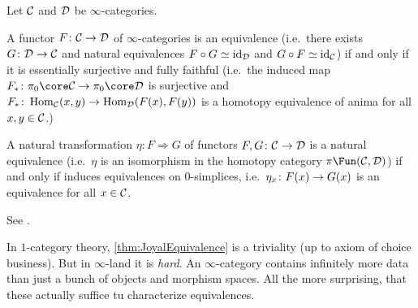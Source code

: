\documentclass[a4paper, 10pt, oneside, DIV=9, chapterprefix=true, numbers=enddot,bibliography=totoc]{scrbook}
\newcommand{\embrace}[1]{\textup{(}#1\textup{)}}
\begin{document}
\begin{thm}[Joyal]\label{thm:JoyalEquivalence}
	Let $\mathcal{C}$ and $\mathcal{D}$ be $\infty$-categories.
	\begin{alphanumerate}
		\item A functor $F\colon \Cc\morphism\Dd$ of $\infty$-categories is an equivalence \embrace{i.e.\ there exists $G\colon \Dd\morphism \Cc$ and natural equivalences $F\circ G\simeq \operatorname{id}_{\mathcal{D}}$ and $G\circ F\simeq \operatorname{id}_{\mathcal{C}}$} if and only if it is essentially surjective and fully faithful \embrace{i.e.\ the induced map $F_*\colon \pi_0\core\Cc\morphism\pi_0\core\Dd$ is surjective and $F_*\colon \Hom_\Cc(x,y)\morphism \Hom_\Dd(F(x),F(y))$ is a homotopy equivalence of anima for all $x,y\in \mathcal{C}$.}
		\item A natural transformation $\eta\colon F\Rightarrow G$ of functors $F,G\colon \Cc\morphism\Dd$ is a natural equivalence \embrace{i.e.\ $\eta$ is an isomorphism in the homotopy category $\pi\Fun(\Cc,\Dd)$} if and only if induces equivalences on $0$-simplices, i.e.\ $\eta_x\colon F(x)\morphism G(x)$ is an equivalence for all $x\in \mathcal{C}$.
	\end{alphanumerate}
\end{thm}
\begin{proof*}
	See \cite[Theorem~VII.1, Theorem~VII.8]{HigherCatsI}.
\end{proof*}
In $1$-category theory, \cref{thm:JoyalEquivalence} is a triviality (up to axiom of choice business). But in $\infty$-land it is \emph{hard}. An $\infty$-category contains infinitely more data than just a bunch of objects and morphism spaces. All the more surprising, that these actually suffice tu characterize equivalences.
\end{document}
